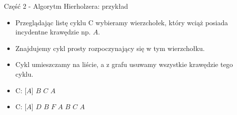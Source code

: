 \documentclass[polish,envcountsect,10pt]{beamer}
\begin{document}
\begin{frame}{Część 2 - Algorytm Hierholzera: przykład}
    \begin{itemize}
        \item Przeglądając listę cyklu C wybieramy wierzchołek, który wciąż posiada incydentne krawędzie np. $A$.
        \item Znajdujemy cykl prosty rozpoczynający się w tym wierzchołku.
        \item Cykl umieszczamy na liście, a z grafu usuwamy wszystkie krawędzie tego cyklu.
        \item C: [$A$] $B$ $C$ $A$
        \item C: [$A$] $D$ $B$ $F$ $A$ $B$ $C$ $A$
    \end{itemize}
    \begin{center}
    \end{center}
\end{frame}
\end{document}
